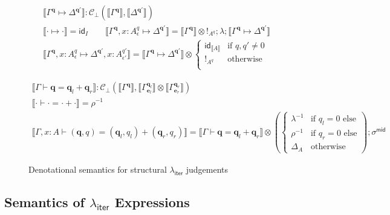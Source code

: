 \documentclass[acmsmall,screen,review]{acmart}
\newcommand{\mc}[1]{\ensuremath{\mathcal{#1}}}
\newcommand{\mb}[1]{\ensuremath{\mathbf{#1}}}
\newcommand{\ms}[1]{\ensuremath{\mathsf{#1}}}
\newcommand{\qsp}[4]{#1 \vdash #2 = #3 + #4}
\newcommand{\cwk}[2]{#1 \mapsto #2}
\newcommand{\dnt}[1]{\llbracket{#1}\rrbracket}
\newcommand{\subiterexp}{\texorpdfstring{\(\lambda_{\ms{iter}}\)}{lambda-iter}}
\begin{document}
\begin{figure}
  \begin{adjustbox}{minipage=1.1\textwidth,scale=0.9}
  \begin{gather*}
    \boxed{\dnt{\cwk{\Gamma^{\mb{q}}}{\Delta^{\mb{q}'}}} 
      : \mc{C}_\bot(\dnt{\Gamma^{\mb{q}}}, \dnt{\Delta^{\mb{q}'}})} \\
    \dnt{\cwk{\cdot}{\cdot}} = \ms{id}_I \qquad
    \dnt{\cwk{\Gamma^{\mb{q}}, x : A^q_\epsilon}{\Delta^{\mb{q}'}}}
      = \dnt{\Gamma^{\mb{q}}} \otimes !_{A^q}
      ; \lambda
      ; \dnt{\cwk{\Gamma^{\mb{q}}}{\Delta^{\mb{q}'}}} \\
    \dnt{\cwk{\Gamma^{\mb{q}}, x : A^q_\epsilon}
              {\Delta^{\mb{q}'}, x : A^{q'}_{\epsilon'}}}
      = \dnt{\cwk{\Gamma^{\mb{q}}}{\Delta^{\mb{q}'}}} \otimes \begin{cases}
        \ms{id}_{\dnt{A}} & \text{if } q, q' \neq 0 \\
        !_{A^q} & \text{otherwise} \\
      \end{cases}
  \end{gather*}

  \begin{gather*}
    \boxed{\dnt{\qsp{\Gamma}{\mb{q}}{\mb{q}_l}{\mb{q}_r}} 
      : \mc{C}_\bot(\dnt{\Gamma^{\mb{q}}}, 
        \dnt{\Gamma^{\mb{q}_l}_{\mb{e}_l}} \otimes \dnt{\Gamma^{\mb{q}_r}_{\mb{e}_r}})} 
    \\
    \dnt{\qsp{\cdot}{\cdot}{\cdot}{\cdot}} = \rho^{-1}
    \\
    \dnt{\qsp{\Gamma, x : A}{(\mb{q}, q)}{(\mb{q}_l, q_l)}{(\mb{q}_r, q_r)}}
    = \dnt{\qsp{\Gamma}{\mb{q}}{\mb{q}_l}{\mb{q}_r}} \otimes
    \left(\begin{cases}
      \lambda^{-1} & \text{if } q_l = 0 \text{ else} \\
      \rho^{-1} & \text{if } q_r = 0 \text{ else} \\
      \Delta_A & \text{otherwise}
    \end{cases}\right) 
    ; \sigma^{\ms{mid}}
  \end{gather*}
  \end{adjustbox}
  \caption{Denotational semantics for structural \subiterexp{} judgements}
  \Description{}
  \label{fig:struct-sem}
\end{figure}

\subsection{Semantics of \subiterexp{} Expressions}
\end{document}
